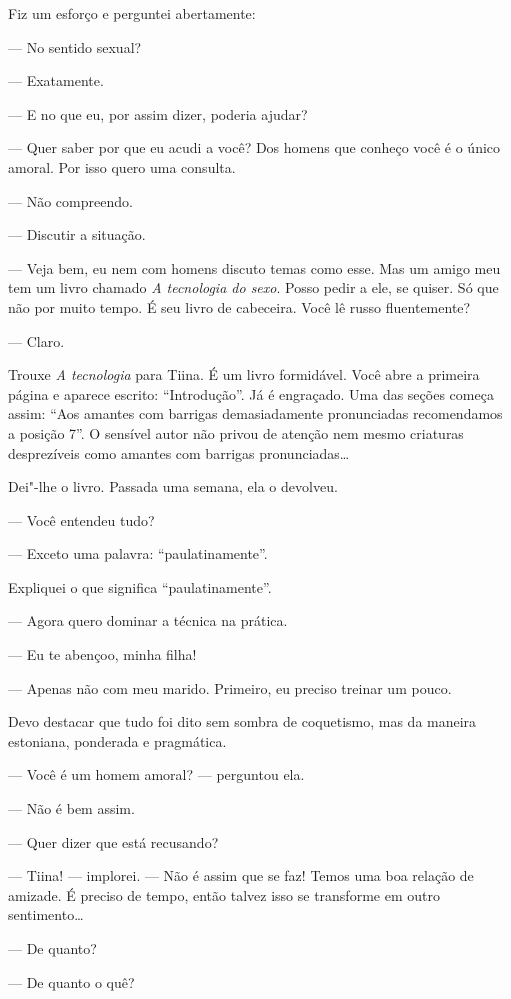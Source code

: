 Fiz um esforço e perguntei abertamente:

--- No sentido sexual?

--- Exatamente.

--- E no que eu, por assim dizer, poderia ajudar?

--- Quer saber por que eu acudi a você? Dos homens que conheço você é o
único amoral. Por isso quero uma consulta.

--- Não compreendo.

--- Discutir a situação.

--- Veja bem, eu nem com homens discuto temas como esse. Mas um amigo
meu tem um livro chamado \emph{A tecnologia do sexo}. Posso pedir a ele,
se quiser. Só que não por muito tempo. É seu livro de cabeceira. Você lê
russo fluentemente?

--- Claro.

Trouxe \emph{A tecnologia} para Tiina. É um livro formidável. Você abre
a primeira página e aparece escrito: ``Introdução''. Já é engraçado. Uma
das seções começa assim: ``Aos amantes com barrigas demasiadamente
pronunciadas recomendamos a posição 7''. O sensível autor não privou de
atenção nem mesmo criaturas desprezíveis como amantes com barrigas
pronunciadas\ldots{}

Dei"-lhe o livro. Passada uma semana, ela o devolveu.

--- Você entendeu tudo?

--- Exceto uma palavra: ``paulatinamente''.

Expliquei o que significa ``paulatinamente''.

--- Agora quero dominar a técnica na prática.

--- Eu te abençoo, minha filha!

--- Apenas não com meu marido. Primeiro, eu preciso treinar um pouco.

Devo destacar que tudo foi dito sem sombra de coquetismo, mas da maneira
estoniana, ponderada e pragmática.

--- Você é um homem amoral? --- perguntou ela.

--- Não é bem assim.

--- Quer dizer que está recusando?

--- Tiina! --- implorei. --- Não é assim que se faz! Temos uma boa
relação de amizade. É preciso de tempo, então talvez isso se transforme
em outro sentimento\ldots{}

--- De quanto?

--- De quanto o quê?

